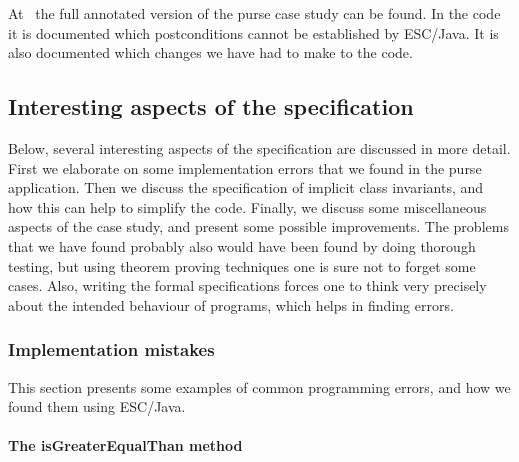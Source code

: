 \documentclass[a4paper]{llncs}
\begin{document}
At~\cite{CatanoH01Url} the full annotated version of the purse case
study can be found. In the code it is documented which postconditions
cannot be established by ESC/Java. It is also documented which changes 
we have had to make to the code.




\subsection{Interesting aspects of the specification}\label{SectSpecDetails}
Below, several interesting aspects of the specification are discussed
in more detail. First we elaborate on some implementation errors
that we found in the purse application.  Then we discuss the
specification of implicit class invariants, and how this can help to
simplify the code. Finally, we discuss some miscellaneous aspects of
the case study, and present some possible improvements. The problems
that we have found probably also would have been found by doing
thorough testing, but using theorem proving techniques one is sure not
to forget some cases. Also, writing the formal specifications forces
one to think very precisely about the intended behaviour of programs,
which helps in finding errors. 






\subsubsection{Implementation mistakes}
This section presents some examples of common programming
errors, and how we found them using ESC/Java.



\paragraph{The isGreaterEqualThan method}
\end{document}
